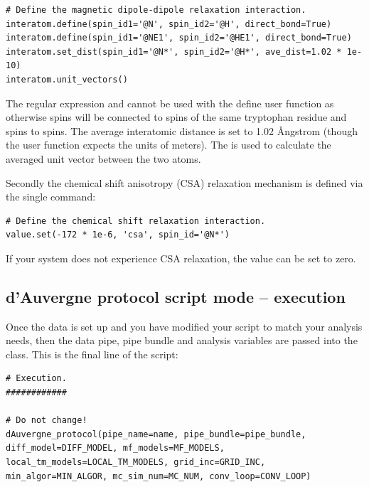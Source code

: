 \begin{htmlonly}
\begin{htmlonly}
\begin{lstlisting}[firstnumber=192]
# Define the magnetic dipole-dipole relaxation interaction.
interatom.define(spin_id1='@N', spin_id2='@H', direct_bond=True)
interatom.define(spin_id1='@NE1', spin_id2='@HE1', direct_bond=True)
interatom.set_dist(spin_id1='@N*', spin_id2='@H*', ave_dist=1.02 * 1e-10)
interatom.unit_vectors()
\end{lstlisting}

The regular expression  and  cannot be used with the  define user function as otherwise  spins will be connected to  spins of the same tryptophan residue and  spins to  spins.  The average interatomic distance is set to 1.02 \AA ngstrom (though the  user function expects the units of meters).  The  is used to calculate the averaged unit vector between the two atoms.

Secondly the chemical shift anisotropy (CSA) relaxation mechanism is defined via the single command:

\begin{lstlisting}[firstnumber=198]
# Define the chemical shift relaxation interaction.
value.set(-172 * 1e-6, 'csa', spin_id='@N*')
\end{lstlisting}

If your system does not experience CSA relaxation, the value can be set to zero.


\subsection{d'Auvergne protocol script mode -- execution}

Once the data is set up and you have modified your script to match your analysis needs, then the data pipe, pipe bundle and analysis variables are passed into the  class.  This is the final line of the script:

\begin{lstlisting}[firstnumber=203]
# Execution.
############

# Do not change!
dAuvergne_protocol(pipe_name=name, pipe_bundle=pipe_bundle, diff_model=DIFF_MODEL, mf_models=MF_MODELS, local_tm_models=LOCAL_TM_MODELS, grid_inc=GRID_INC, min_algor=MIN_ALGOR, mc_sim_num=MC_NUM, conv_loop=CONV_LOOP)
\end{lstlisting}


\end{htmlonly}
\end{htmlonly}
